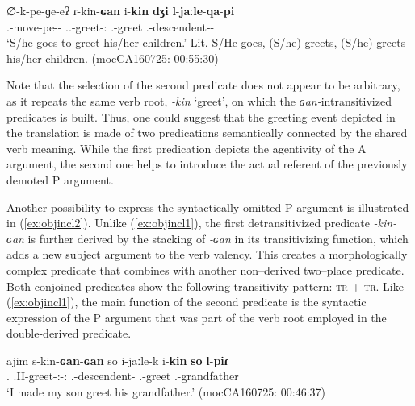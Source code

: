\documentclass[12pt]{article}
\begin{document}
\begin{exe}
\ex 
	 \gll ∅-k-pe-ɡe-eʔ ɾ-kin-\textbf{ɢan} i-\textbf{kin} \textbf{dʒi} \textbf{l}-\textbf{jaːle}-\textbf{qa}-\textbf{pi}   \\
			        {\Third.\II}-move-pe-{\LocTwo}-{\Pl} {\Third.\II.\Intr}-greet-{\Vm:\Intr} {\Third.\II}-greet {\DetFive} {\Third.\Poss}-descendent-{\Pl}-{\Coll}\\
	\trans `S/he goes to greet his/her children.'
\trans	 Lit. S/He goes, (S/he) greets, (S/he) greets his/her children.
	\trans \hfill  (mocCA160725: 00:55:30)\label{ex:objincl1}
\end{exe}

 Note that the selection of the second predicate does not appear to be arbitrary, as it repeats the  same verb root, \textit{-kin} `greet', on which the \textit{ɢan-}intransitivized predicates is built. Thus, one could suggest that the greeting event depicted in the translation is made of two predications semantically connected by the shared verb meaning. While the first predication depicts the agentivity of the A argument, the second one helps to introduce the actual referent of the previously demoted P argument. 

Another possibility to express the syntactically omitted P argument is illustrated in (\ref{ex:objincl2}). Unlike (\ref{ex:objincl1}), the first detransitivized predicate \textit{-kin-ɢan} is further derived by the stacking of \textit{-ɢan} in its transitivizing function, which adds a new subject argument to the verb valency. This creates a morphologically complex predicate that combines with another non--derived two--place predicate. Both conjoined predicates show the following transitivity pattern: \textsc{tr} + \textsc{tr}. Like (\ref{ex:objincl1}), the main function of the second predicate is the syntactic expression of the P argument that was part of the verb root employed in the double-derived predicate.  

\begin{exe}
\ex 
	 \gll ajim s-kin-\textbf{ɢan}-\textbf{ɢan} so i-jaːle-k i-\textbf{kin} \textbf{so} \textbf{l}-\textbf{piɾ}   \\
			        {\First\Sg.\Pron} {\First.II}-greet-{\Vm:\Intr}-{\Vm:\Tr} {\DetTwo} {\First\Sg.\Poss}-descendent-{\M} {\Third.\II}-greet {\DetTwo} {\Third.\Poss}-grandfather\\
	\trans `I made my son greet his grandfather.'  \hfill(mocCA160725: 00:46:37)\label{ex:objincl2}
\end{exe}
\end{document}
